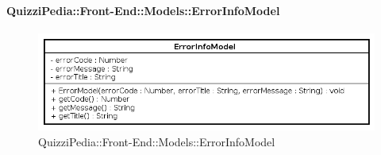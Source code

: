 \paragraph{QuizziPedia::Front-End::Models::ErrorInfoModel}
		
		\label{QuizziPedia::Front-End::Models::ErrorInfoModel}
		
		\begin{figure}[ht]
			\centering
			\includegraphics[scale=0.5,keepaspectratio]{UML/Classi/Front-End/QuizziPedia_Front-end_Models_ErrorInfoModel.png}
			\caption{QuizziPedia::Front-End::Models::ErrorInfoModel}
		\end{figure} \FloatBarrier
		
